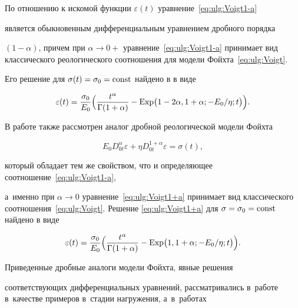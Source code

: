 По отношению к искомой функции $\varepsilon(t)$ уравнение~\eqref{eq:ulg:Voigt1-a}

является обыкновенным дифференциальным уравнением дробного порядка

$(1-\alpha)$, причем при $\alpha\rightarrow0+$ уравнение~\eqref{eq:ulg:Voigt1-a} принимает вид классического реологического соотношения для модели Фойхта~\eqref{eq:ulg:Voigt}.



Его решение для $\sigma(t)=\sigma_{0}=\rm const$ найдено в \cite{ulg:bib:ORY_reology_models} в виде

\begin{equation*}

\varepsilon(t)=\frac{\sigma_{0}}{E_{0}}\Bigl(\frac{t^{\alpha}}{\Gamma(1+\alpha)}-  \mathop{\rm Exp}\nolimits  \bigl(1-2\alpha, 1+\alpha;- {E_{0}}/{\eta};t\bigr)\Bigr).

\end{equation*}

В работе \cite{ulg:bib:ORY_reology_models} также рассмотрен аналог дробной реологической модели Фойхта

\begin{equation}\label{eq:ulg:Voigt1+a}

E_{0}D_{0t}^{\alpha}\varepsilon+\eta D_{0t}^{1+\alpha}\varepsilon=\sigma(t),

\end{equation}

который обладает тем же свойством, что и определяющее соотношение~\eqref{eq:ulg:Voigt1-a}, 

а~именно при $\alpha\rightarrow 0$ уравнение~\eqref{eq:ulg:Voigt1+a} принимает вид классического соотношения~\eqref{eq:ulg:Voigt}. Решение \eqref{eq:ulg:Voigt1+a} для $\sigma=\sigma_{0}=\rm const$ найдено в виде 

\begin{equation*}

\varepsilon(t)=\frac{\sigma_{0}}{E_{0}}

\Bigl(\frac{t^{\alpha}}{\Gamma (1+\alpha)}-  \mathop{\rm Exp}\nolimits  \bigl(1, 1+\alpha;-{E_{0}}/{\eta};t\bigr)\Bigr).

\end{equation*}



Приведенные дробные аналоги модели Фойхта, явные решения

соответствующих дифференциальных уравнений, рассматривались в~работе \cite{ulg:bib:ORY_reology_models} в~качестве примеров в~стадии нагружения, а~в~работах

